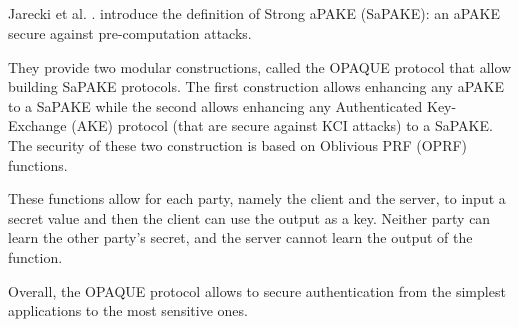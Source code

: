 \documentclass[../report.tex]{subfiles}
\begin{document}



\subsection{}


\paragraph{}
Jarecki et al. \cite{OPAQUE_Paper}. introduce the definition of Strong aPAKE (SaPAKE): an aPAKE secure against pre-computation attacks.

They provide two modular constructions, called the OPAQUE protocol that allow building SaPAKE protocols. The first construction allows enhancing any aPAKE to a SaPAKE while the second allows enhancing any Authenticated Key-Exchange (AKE) protocol (that are secure against KCI attacks) to a SaPAKE.
The security of these two construction is based on Oblivious PRF (OPRF) functions. %

These functions allow for each party, namely the client and the server, to input a secret value and then the client can use the output as a key. Neither party can learn the other party's secret, and the server cannot learn the output of the function.

Overall, the OPAQUE protocol allows to secure authentication from the simplest applications to the most sensitive ones.





% 
% 
% 
\end{document}
